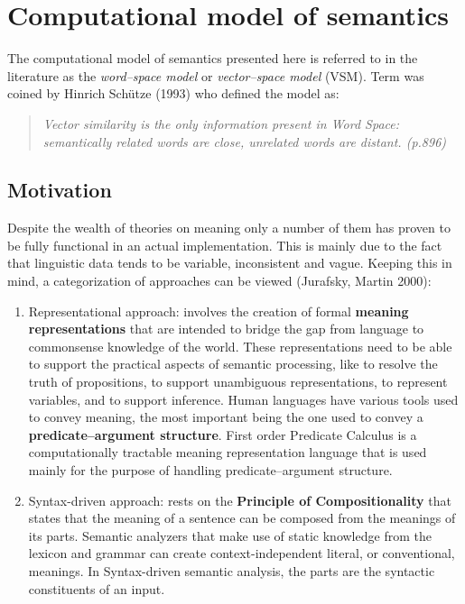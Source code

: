 \chapter{Computational model of semantics}
The computational model of semantics presented here is referred to in the literature as the \textit{word--space model} or \textit{vector--space model} (VSM). Term was coined by Hinrich Sch\"{u}tze (1993) who defined the model as:
\begin{quotation}\textit{Vector similarity is the only information present in Word Space: semantically related words are close, unrelated words are distant. (p.896)}
\end{quotation}

\section{Motivation}
Despite the wealth of theories on meaning only a number of them has proven to be fully functional in an actual implementation. This is mainly due to the fact that linguistic data tends to be variable, inconsistent and vague. Keeping this in mind, a categorization of approaches can be viewed (Jurafsky, Martin 2000):
\begin{enumerate}
\item Representational approach: involves the creation of formal \textbf{meaning representations} that are intended to bridge the
gap from language to commonsense knowledge of the world. These representations need to be able to support the practical aspects of semantic processing, like to resolve the truth of propositions, to support unambiguous representations,
to represent variables, and to support inference. Human languages have various tools used to convey meaning, the most important being the one used to convey a \textbf{predicate--argument structure}. First order Predicate Calculus is a computationally tractable
meaning representation language that is used mainly for the purpose of handling predicate--argument structure. 
\item Syntax-driven approach: rests on the \textbf{Principle of Compositionality} that states that the meaning of a sentence can
be composed from the meanings of its parts. Semantic analyzers that make use of static knowledge from the lexicon and
grammar can create context-independent literal, or conventional, meanings. In Syntax-driven semantic analysis, the parts are the syntactic constituents
of an input.
\end{enumerate}
